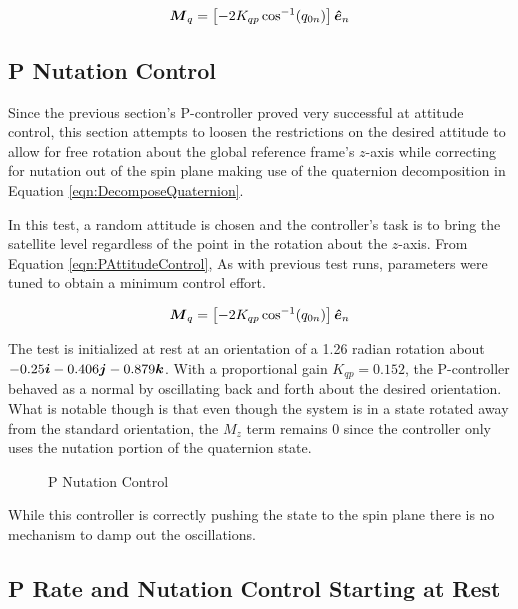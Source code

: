 \begin{equation}
  \boldsymbol{M}_{q} = \left[-2 K_{qp} \cos^{-1} (q_{0n}) \right] \boldsymbol{\hat{e}}_n
  \label{eqn:QuaternionToMomentConversion}
\end{equation}


\subsection{P Nutation Control}
\label{subsec:PNutationControl}

Since the previous section's P-controller proved very successful at attitude control, this section attempts to loosen the restrictions on the desired attitude to allow for free rotation about the global reference frame's $z$-axis while correcting for nutation out of the spin plane making use of the quaternion decomposition in Equation \ref{eqn:DecomposeQuaternion}.

In this test, a random attitude is chosen and the controller's task is to bring the satellite level regardless of the point in the rotation about the $z$-axis.  From Equation \ref{eqn:PAttitudeControl},    As with previous test runs, parameters were tuned to obtain a minimum control effort.

\begin{equation}
  \boldsymbol{M}_{q} = \left[-2 K_{qp} \cos^{-1} (q_{0n}) \right] \boldsymbol{\hat{e}}_n
  \label{eqn:PNutationControl}
\end{equation}


The test is initialized at rest at an orientation of a 1.26 radian rotation about $-0.25 \boldsymbol{i} -0.406\boldsymbol{j} -0.879\boldsymbol{k}$.  With a proportional gain $K_{qp} = 0.152$, the P-controller behaved as a normal by oscillating back and forth about the desired orientation.  What is notable though is that even though the system is in a state rotated away from the standard orientation, the $M_z$ term remains 0 since the controller only uses the nutation portion of the quaternion state.

\begin{figure}[H]
  \centerline{}
  \caption{P Nutation Control}
  \label{fig:PNutationControl}
\end{figure}

While this controller is correctly pushing the state to the spin plane there is no mechanism to damp out the oscillations.

\subsection{P Rate and Nutation Control Starting at Rest}
\label{subsec:PRateNutationControlStartingatRest}

